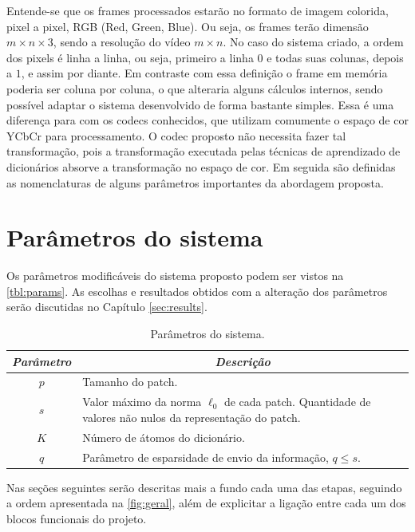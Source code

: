 \documentclass[cic,tc]{iiufrgs}
\begin{document}
Entende-se que os frames processados estarão no formato de imagem colorida,
pixel a pixel, RGB (Red, Green, Blue). 
Ou seja, os frames terão dimensão 
$m \times n \times 3$,
sendo a resolução do vídeo $m \times n$. 
No caso do sistema criado, a ordem dos pixels é 
linha a linha, ou seja, primeiro a linha $0$ e todas suas colunas, depois a $1$, e assim por diante.
Em contraste com essa definição o frame em memória poderia ser coluna por coluna, o que alteraria
alguns cálculos internos, sendo possível adaptar o sistema desenvolvido de forma bastante simples.
Essa é uma diferença para com os codecs conhecidos, que utilizam comumente o espaço de cor YCbCr
para processamento.
O codec proposto não necessita fazer tal transformação, pois a transformação executada pelas 
técnicas de aprendizado de dicionários absorve a transformação no espaço de cor.
Em seguida são definidas as nomenclaturas de alguns parâmetros importantes da abordagem proposta.

\section{Parâmetros do sistema}
Os parâmetros modificáveis do sistema proposto podem ser vistos na \autoref{tbl:params}. 
As escolhas e resultados obtidos com a alteração dos parâmetros serão discutidas no 
Capítulo \ref{sec:results}.

\begin{table}[h]
    \caption{Parâmetros do sistema.}
    \centering
        \begin{tabular}{|c|p{10cm}|}
          \hline
          \multicolumn{1}{|c|}{\textit{Parâmetro}} & 
            \multicolumn{1}{c|}{\textit{Descrição}}\\
          \hline
          \hline
          $p$    & Tamanho do patch. \\ 
          $s$    & Valor máximo da norma $\ell_0$ de cada patch. Quantidade de valores não nulos da representação do patch. \\     
          $K$    & Número de átomos do dicionário. \\
          $q$    & Parâmetro de esparsidade de envio da informação, $q \le s$. \\
          \hline
        \end{tabular}
    \label{tbl:params}
\end{table}

Nas seções seguintes serão descritas mais a fundo cada uma das etapas, seguindo a ordem
apresentada na \autoref{fig:geral}, além de explicitar a ligação entre cada um dos blocos funcionais
do projeto.
\end{document}
